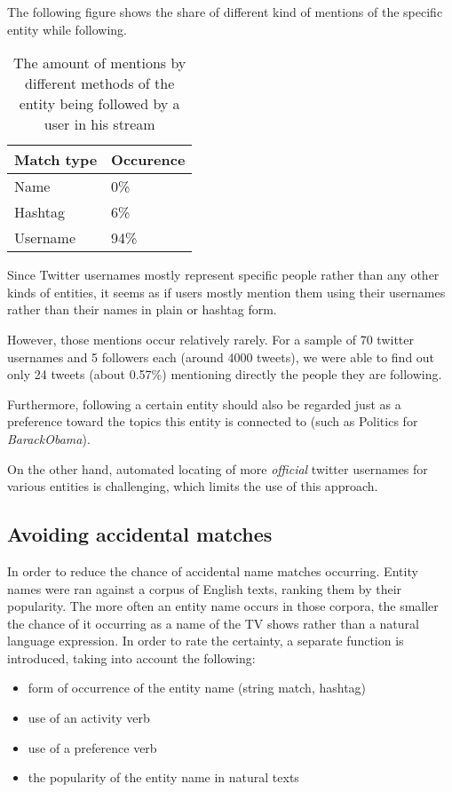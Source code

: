 The following figure shows the share of different kind of mentions of the specific entity while following.

\begin{center}
  \begin{table}[h!b!p!]
    \begin{tabular}{ | p{3cm}| p{2cm} | } \hline
      Match type & Occurence \\ \hline
      Name & 0\% \\ \hline
      Hashtag & 6\% \\ \hline
      Username & 94\% \\ \hline
    \end{tabular}
    \caption{The amount of mentions by different methods of the entity being followed by a user in his stream}
  \end{table}
\end{center}

Since Twitter usernames mostly represent specific people rather than any other kinds of entities, it seems as if users mostly
mention them using their usernames rather than their names in plain or hashtag form.

However, those mentions occur relatively rarely. For a sample of 70 twitter usernames and 5 followers each
(around 4000 tweets), we were able to find out only 24 tweets (about 0.57\%) mentioning directly the people they are following.

Furthermore, following a certain entity should also be regarded just as a preference toward the topics this entity is connected to (such as Politics for \textit{BarackObama}).

On the other hand, automated locating of more \textit{official} twitter usernames for various entities is challenging, which
limits the use of this approach.

\subsection{Avoiding accidental matches}
In order to reduce the chance of accidental name matches occurring. Entity names were ran against a corpus of English texts,
ranking them by their popularity. The more often an entity name occurs in those corpora, the smaller the chance of it occurring as a name of the TV shows rather than a natural language expression. In order to rate the certainty, a separate function is introduced, taking into account the following:

\begin{itemize}
  \item form of occurrence of the entity name (string match, hashtag)
  \item use of an activity verb
  \item use of a preference verb
  \item the popularity of the entity name in natural texts
\end{itemize}

